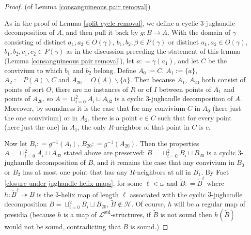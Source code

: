 \documentclass{amsart}
\theoremstyle{definition}
\theoremstyle{remark}
\numberwithin{equation}{section}
\begin{document}
\begin{proof}
 (of Lemma \ref{consanguineous pair removal})


 As in the proof of Lemma \ref{split cycle removal}, we define a cyclic $3$-jughandle decomposition of $A$, and then pull it back by $g: B \to A$. With the domain of $\gamma$ consisting of distinct $a_1, a_2 \in O(\gamma)$, $b_1, b_2, \beta \in P(\gamma)$ or distinct $a_1, a_2 \in O(\gamma)$, $b_1, b_2, c_1, c_2 \in P(\gamma)$ as in the discussion preceding the statement of this lemma (Lemma \ref{consanguineous pair removal}), let $a : = \gamma(a_1)$, and let $C$ be the convivium to which $b_1$ and $b_2$ belong. Define $A_{0} := C$, $A_{1} := \{a\}$, $A_{2} := P(A) \backslash C$ and $A_{20} = O(A) \backslash \{a\}$. Then because $A_{1}$, $A_{20}$ both consist of points of sort $O$, there are no instances of $R$ or of $I$ between points of $A_{1}$ and points of $A_{20}$, so $A = \sqcup^{2}_{i=0} A_i \sqcup A_{02}$ is a cyclic $3$-jughandle decomposition of $A$. Moreover, by soundness it is the case that for any convivium $C$ in $A_{0}$ (here just the one convivium) or in $A_{2}$, there is a point $c \in C$ such that for every point (here just the one) in $A_{1}$, the only $R$-neighbor of that point in $C$ is $c$.

 Now let $B_i : = g^{-1}(A_i)$, $B_{20} : = g^{-1}(A_{20})$. Then the properties $A = \sqcup^{2}_{i=0} A_i \sqcup A_{02}$ stated above are preserved: $B = \sqcup^{2}_{i=0} B_i \sqcup B_{20}$ is a cyclic $3$-jughandle decomposition of $B$, and it remains the case that any convivium in $B_{0}$ or $B_{2}$ has at most one point that has any $R$-neighbors at all in $B_{1}$. By Fact \ref{closure under jughandle helix maps}, for some $\ell < \omega$ and $\tilde{B} : = \tilde{B}^{\ell}$ where $h: \tilde{B}^{\ell} \twoheadrightarrow B $ is the $3$-helix map of length $\ell$ associated with the cyclic $3$-jughandle decomposition $B = \sqcup^{2}_{i=0} B_i \sqcup B_{20}$, $\tilde{B} \notin \mathcal{H}$. Of course, $h$ will be a regular map of presidia (because $h$ is a map of $\mathcal{L}^{\mathrm{std}}$-structures, if $\tilde{B}$ is not sound then $h(\tilde{B})$ would not be sound, contradicting that $B$ is sound.)



\end{proof}
\end{document}

